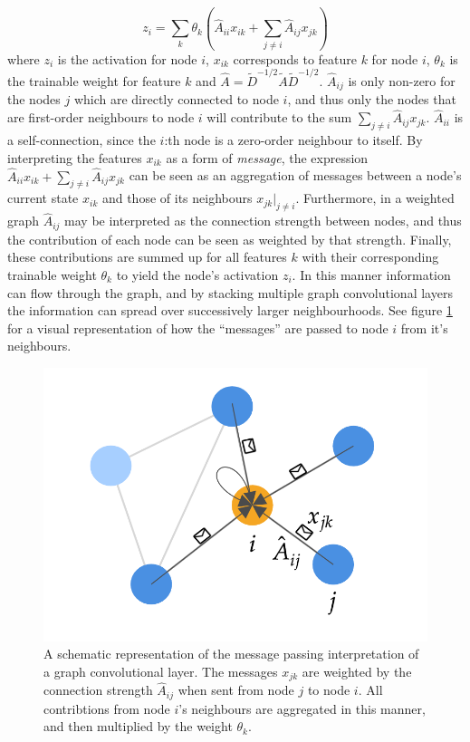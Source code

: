 \begin{equation}
    z_i = \sum_k \theta_k \left(\hat{A}_{ii} x_{ik} + \sum_{j \neq i} \hat{A}_{ij} x_{jk} \right)
\end{equation}
where $z_i$ is the activation for node $i$, $x_{ik}$ corresponds to feature $k$ for node $i$, $\theta_k$ is the trainable weight for feature $k$ and $\hat{A} = \tilde{D}^{-1/2} \tilde{A} \tilde{D}^{-1/2}$. $\hat{A}_{ij}$ is only non-zero for the nodes $j$ which are directly connected to node $i$, and thus only the nodes that are first-order neighbours to node $i$ will contribute to the sum $\sum_{j \neq i} \hat{A}_{ij} x_{jk}$. $\hat{A}_{ii}$ is a self-connection, since the $i$:th node is a zero-order neighbour to itself.
By interpreting the features $x_{ik}$ as a form of \textit{message}, the expression $\hat{A}_{ii} x_{ik} + \sum_{j \neq i} \hat{A}_{ij} x_{jk}$ can be seen as an aggregation of messages between a node's current state $x_{ik}$ and those of its neighbours $x_{jk}\left.\right\rvert_{j\neq i}$. Furthermore, in a weighted graph $\hat{A}_{ij}$ may be interpreted as the connection strength between nodes, and thus the contribution of each node can be seen as weighted by that strength. Finally, these contributions are summed up for all features $k$ with their corresponding trainable weight $\theta_k$ to yield the node's activation $z_i$. In this manner information can flow through the graph, and by stacking multiple graph convolutional layers the information can spread over successively larger neighbourhoods. See figure \ref{fig:message_passing} for a visual representation of how the ``messages'' are passed to node $i$ from it's neighbours.

\begin{figure}[H]
    \centering
    \includegraphics[width=0.5\linewidth]{chapters/images_theory/message_passing.png}
    \caption{A schematic representation of the message passing interpretation of a graph convolutional layer. The messages $x_{jk}$ are weighted by the connection strength $\hat{A}_{ij}$ when sent from node $j$ to node $i$. All contribtions from node $i$'s neighbours are aggregated in this manner, and then multiplied by the weight $\theta_k$.}
    \label{fig:message_passing}
\end{figure}


